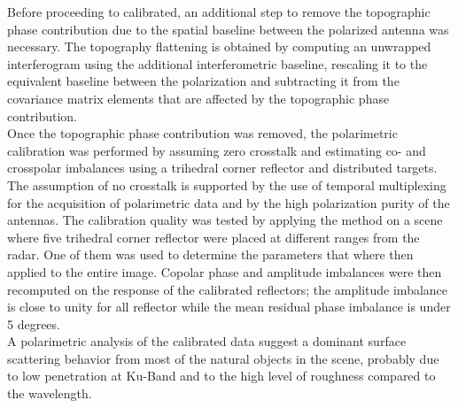 Before proceeding to calibrated, an additional step to remove the topographic phase contribution due to the spatial baseline between the polarized antenna was necessary. The topography flattening is obtained by computing an unwrapped  interferogram using the additional interferometric baseline, rescaling it to the equivalent baseline between the polarization and subtracting it from the covariance matrix elements that are affected by the topographic phase contribution.\\ Once the topographic phase contribution was removed, the polarimetric calibration was performed by assuming zero crosstalk and estimating co- and crosspolar imbalances using a trihedral corner reflector and distributed targets. The assumption of no crosstalk is supported by the use of temporal multiplexing for the acquisition of polarimetric data and by the high polarization purity of the antennas. The calibration quality was tested by applying the method on a scene where five trihedral corner reflector were placed at different ranges from the radar. One of them was used to determine the parameters that where then applied to the entire image. Copolar phase and amplitude imbalances were then recomputed on the response of the calibrated reflectors; the amplitude imbalance is close to unity for all reflector while the mean residual phase imbalance is under 5 degrees.\\
A polarimetric analysis of the calibrated data suggest a dominant surface scattering behavior from most of the natural objects in the scene, probably due to low penetration at Ku-Band and to the high level of roughness compared to the wavelength.